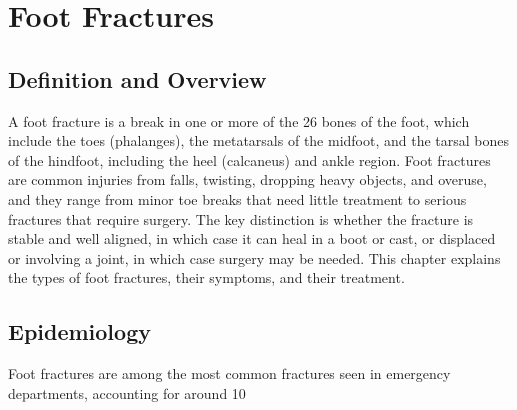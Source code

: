 \chapter{Foot Fractures}

\section*{Definition and Overview}
A foot fracture is a break in one or more of the 26 bones of the foot, which include the toes (phalanges), the metatarsals of the midfoot, and the tarsal bones of the hindfoot, including the heel (calcaneus) and ankle region. Foot fractures are common injuries from falls, twisting, dropping heavy objects, and overuse, and they range from minor toe breaks that need little treatment to serious fractures that require surgery. The key distinction is whether the fracture is stable and well aligned, in which case it can heal in a boot or cast, or displaced or involving a joint, in which case surgery may be needed. This chapter explains the types of foot fractures, their symptoms, and their treatment.

\section*{Epidemiology}
Foot fractures are among the most common fractures seen in emergency departments, accounting for around 10%

